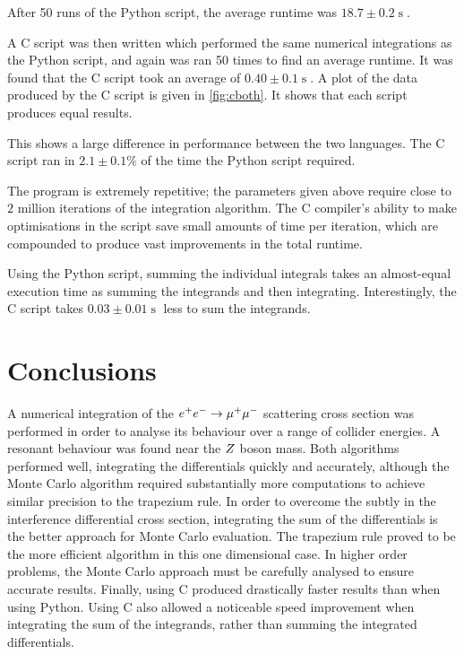 \documentclass[]{article}
\begin{document}
After 50 runs of the Python script, the average runtime was $18.7 \pm 0.2 \operatorname{s}$.

A C script was then written which performed the same numerical integrations as the Python script, and again was ran 50 times to find an average runtime. It was found that the C script took an average of $0.40 \pm 0.1 \operatorname{s}$. A plot of the data produced by the C script is given in \ref{fig:cboth}. It shows that each script produces equal results.

This shows a large difference in performance between the two languages. The C script ran in $2.1\pm0.1\%$ of the time the Python script required.

The program is extremely repetitive; the parameters given above require close to $2$ million iterations of the integration algorithm. The C compiler's ability to make optimisations in the script save small amounts of time per iteration, which are compounded to produce vast improvements in the total runtime.

Using the Python script, summing the individual integrals takes an almost-equal execution time as summing the integrands and then integrating. Interestingly, the C script takes $0.03\pm0.01\operatorname{s}$ less to sum the integrands.

\section{Conclusions}\label{sec:conclusion}

A numerical integration of the $e^+ e^-  \rightarrow \mathrm{\mu^+ \mu^-} $ scattering cross section was performed in order to analyse its behaviour over a range of collider energies. A resonant behaviour was found near the $Z $ boson mass. Both algorithms performed well, integrating the differentials quickly and accurately, although the Monte Carlo algorithm required substantially more computations to achieve similar precision to the trapezium rule. In order to overcome the subtly in the interference differential cross section, integrating the sum of the differentials is the better approach for Monte Carlo evaluation. The trapezium rule proved to be the more efficient algorithm in this one dimensional case. In higher order problems, the Monte Carlo approach must be carefully analysed to ensure accurate results. Finally, using C produced drastically faster results than when using Python. Using C also allowed a noticeable speed improvement when integrating the sum of the integrands, rather than summing the integrated differentials.
\end{document}
